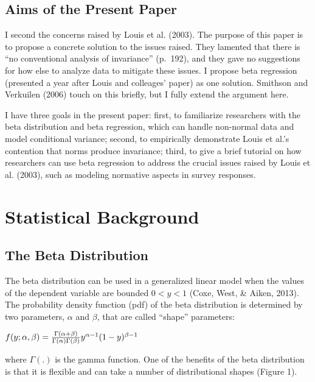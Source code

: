 \documentclass[english,man]{apa6}
\theoremstyle{definition}
\theoremstyle{definition}
\theoremstyle{remark}
\begin{document}
\subsection{Aims of the Present Paper}\label{aims-of-the-present-paper}

I second the concerns raised by Louis et al. (2003). The purpose of this
paper is to propose a concrete solution to the issues raised. They
lamented that there is \enquote{no conventional analysis of invariance}
(p.~192), and they gave no suggestions for how else to analyze data to
mitigate these issues. I propose beta regression (presented a year after
Louis and colleages' paper) as one solution. Smithson and Verkuilen
(2006) touch on this briefly, but I fully extend the argument here.

I have three goals in the present paper: first, to familiarize
researchers with the beta distribution and beta regression, which can
handle non-normal data and model conditional variance; second, to
empirically demonstrate Louis et al.'s contention that norms produce
invariance; third, to give a brief tutorial on how researchers can use
beta regression to address the crucial issues raised by Louis et al.
(2003), such as modeling normative aspects in survey responses.

\section{Statistical Background}\label{statistical-background}

\subsection{The Beta Distribution}\label{the-beta-distribution}

The beta distribution can be used in a generalized linear model when the
values of the dependent variable are bounded \(0 < y < 1\) (Coxe, West,
\& Aiken, 2013). The probability density function (pdf) of the beta
distribution is determined by two parameters, \(\alpha\) and \(\beta\),
that are called \enquote{shape} parameters:

\begin{center}
$f(y;\alpha,\beta)={\Gamma(\alpha+\beta)\over\Gamma(\alpha)\Gamma(\beta)}y^{\alpha-1}(1-y)^{\beta-1}$
\end{center}

where \(\Gamma(.)\) is the gamma function. One of the benefits of the
beta distribution is that it is flexible and can take a number of
distributional shapes (Figure 1).
\end{document}
